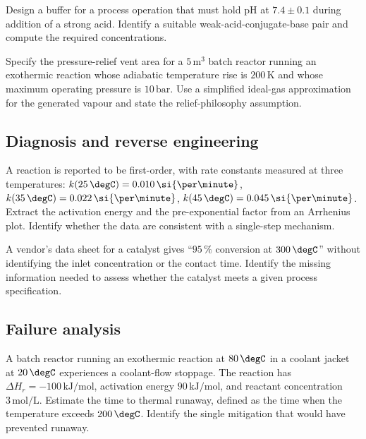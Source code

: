 \begin{exercise}
Design a buffer for a process operation that must hold pH at $7.4
\pm 0.1$ during addition of a strong acid. Identify a suitable
weak-acid-conjugate-base pair and compute the required concentrations.
\end{exercise}

\begin{exercise}
Specify the pressure-relief vent area for a $5\,\text{m}^3$ batch
reactor running an exothermic reaction whose adiabatic temperature
rise is $200\,\si{\kelvin}$ and whose maximum operating pressure is
$10\,\text{bar}$. Use a simplified ideal-gas approximation for the
generated vapour and state the relief-philosophy assumption.
\end{exercise}

\subsection*{Diagnosis and reverse engineering}

\begin{exercise}
A reaction is reported to be first-order, with rate constants
measured at three temperatures: $k(25\,\degC) = 0.010\,
\si{\per\minute}$, $k(35\,\degC) = 0.022\,\si{\per\minute}$,
$k(45\,\degC) = 0.045\,\si{\per\minute}$. Extract the activation
energy and the pre-exponential factor from an Arrhenius plot.
Identify whether the data are consistent with a single-step
mechanism.
\end{exercise}

\begin{exercise}
A vendor's data sheet for a catalyst gives ``$95\,\%$ conversion at
$300\,\degC$'' without identifying the inlet concentration or the
contact time. Identify the missing information needed to assess
whether the catalyst meets a given process specification.
\end{exercise}

\subsection*{Failure analysis}

\begin{exercise}
A batch reactor running an exothermic reaction at $80\,\degC$ in a
coolant jacket at $20\,\degC$ experiences a coolant-flow stoppage.
The reaction has $\Delta H_r = -100\,\text{kJ}/\text{mol}$, activation
energy $90\,\text{kJ}/\text{mol}$, and reactant concentration $3\,
\text{mol}/\text{L}$. Estimate the time to thermal runaway, defined as
the time when the temperature exceeds $200\,\degC$. Identify the
single mitigation that would have prevented runaway.
\end{exercise}

